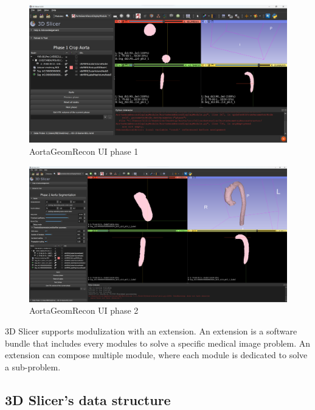 \begin{figure}[ht]
    \centering
    \includegraphics[width=\textwidth]{figures/Sample/SlicerUI.png}
    \caption[AortaGeomRecon phase 1 User Interface]{AortaGeomRecon UI phase 1}
    \label{fig_UI_1}
\end{figure}

\begin{figure}[ht]
    \centering
    \includegraphics[width=\textwidth]{figures/Sample/SlicerUI_2.png}
    \caption[AortaGeomRecon phase 2 User Interface]{AortaGeomRecon UI phase 2}
    \label{fig_UI_2}
\end{figure}

3D Slicer supports modulization with an extension. An extension is a software bundle that includes every modules to solve a specific medical image problem. An extension can compose multiple module, where each module is dedicated to solve a sub-problem.


\subsection{3D Slicer's data structure}

